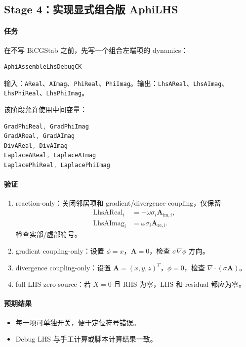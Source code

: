 \documentclass[UTF8,a4paper,11pt]{ctexart}
\newcommand{\code}[1]{\texttt{#1}}
\begin{document}
\subsection{Stage 4：实现显式组合版 AphiLHS}

\paragraph{任务}
在不写 BiCGStab 之前，先写一个组合左端项的 dynamics：
\begin{lstlisting}[language=C++]
AphiAssembleLhsDebugCK
\end{lstlisting}
输入：\code{AReal}、\code{AImag}、\code{PhiReal}、\code{PhiImag}。输出：\code{LhsAReal}、\code{LhsAImag}、\code{LhsPhiReal}、\code{LhsPhiImag}。

该阶段允许使用中间变量：
\begin{lstlisting}[language=C++]
GradPhiReal, GradPhiImag
GradAReal, GradAImag
DivAReal, DivAImag
LaplaceAReal, LaplaceAImag
LaplacePhiReal, LaplacePhiImag
\end{lstlisting}

\paragraph{验证}
\begin{enumerate}
  \item reaction-only：关闭邻居项和 gradient/divergence coupling，仅保留
  \begin{align}
  \mathrm{LhsAReal}_i&=-\omega\sigma_i\bm A_{\mathrm{im},i},\\
  \mathrm{LhsAImag}_i&=\omega\sigma_i\bm A_{\mathrm{re},i}.
  \end{align}
  检查实部/虚部符号。
  \item gradient coupling-only：设置 $\phi=x$，$\bm A=0$，检查 $\sigma\nabla\phi$ 方向。
  \item divergence coupling-only：设置 $\bm A=(x,y,z)^T$，$\phi=0$，检查 $\nabla\cdot(\sigma\bm A)$。
  \item full LHS zero-source：若 $X=0$ 且 RHS 为零，LHS 和 residual 都应为零。
\end{enumerate}

\paragraph{预期结果}
\begin{itemize}
  \item 每一项可单独开关，便于定位符号错误。
  \item Debug LHS 与手工计算或脚本计算结果一致。
\end{itemize}
\end{document}
